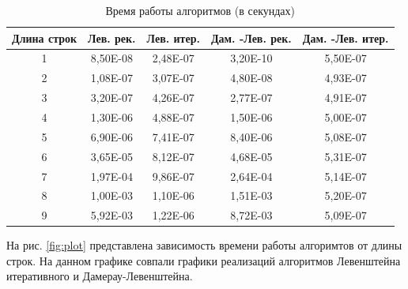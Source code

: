 \documentclass[12pt]{report}
\begin{document}
	\begin{table}[h]
	\centering
	\begin{tabular}{ccccc}
	\multicolumn{1}{l}{Длина строк} &
	  \multicolumn{1}{l}{Лев. рек.} &
	  \multicolumn{1}{l}{Лев. итер.} &
	  \multicolumn{1}{l}{Дам. -Лев. рек.} &
	  \multicolumn{1}{l}{Дам. -Лев. итер.} \\ \hline
	\multicolumn{1}{|c|}{1} & \multicolumn{1}{c|}{8,50E-08} & \multicolumn{1}{c|}{2,48E-07} & \multicolumn{1}{c|}{3,20E-10} & \multicolumn{1}{c|}{5,50E-07} \\ \hline
	\multicolumn{1}{|c|}{2} & \multicolumn{1}{c|}{1,08E-07} & \multicolumn{1}{c|}{3,07E-07} & \multicolumn{1}{c|}{4,80E-08} & \multicolumn{1}{c|}{4,93E-07} \\ \hline
	\multicolumn{1}{|c|}{3} & \multicolumn{1}{c|}{3,20E-07} & \multicolumn{1}{c|}{4,26E-07} & \multicolumn{1}{c|}{2,77E-07} & \multicolumn{1}{c|}{4,91E-07} \\ \hline
	\multicolumn{1}{|c|}{4} & \multicolumn{1}{c|}{1,30E-06} & \multicolumn{1}{c|}{4,88E-07} & \multicolumn{1}{c|}{1,50E-06} & \multicolumn{1}{c|}{5,00E-07} \\ \hline
	\multicolumn{1}{|c|}{5} & \multicolumn{1}{c|}{6,90E-06} & \multicolumn{1}{c|}{7,41E-07} & \multicolumn{1}{c|}{8,40E-06} & \multicolumn{1}{c|}{5,08E-07} \\ \hline
	\multicolumn{1}{|c|}{6} & \multicolumn{1}{c|}{3,65E-05} & \multicolumn{1}{c|}{8,12E-07} & \multicolumn{1}{c|}{4,68E-05} & \multicolumn{1}{c|}{5,31E-07} \\ \hline
	\multicolumn{1}{|c|}{7} & \multicolumn{1}{c|}{1,97E-04} & \multicolumn{1}{c|}{9,86E-07} & \multicolumn{1}{c|}{2,64E-04} & \multicolumn{1}{c|}{5,14E-07} \\ \hline
	\multicolumn{1}{|c|}{8} & \multicolumn{1}{c|}{1,00E-03} & \multicolumn{1}{c|}{1,10E-06} & \multicolumn{1}{c|}{1,51E-03} & \multicolumn{1}{c|}{5,20E-07} \\ \hline
	\multicolumn{1}{|c|}{9} & \multicolumn{1}{c|}{5,92E-03} & \multicolumn{1}{c|}{1,22E-06} & \multicolumn{1}{c|}{8,72E-03} & \multicolumn{1}{c|}{5,09E-07} \\ \hline
	\end{tabular}
	\caption{Время работы алгоритмов (в секундах)}
	\label{tab:bench}
	\end{table}

	\pagebreak

	На рис. \ref{fig:plot} представлена зависимость времени работы алгоримтов от длины строк. На данном графике совпали графики реализаций алгоритмов Левенштейна итеративного и Дамерау-Левенштейна.
	
\end{document}
